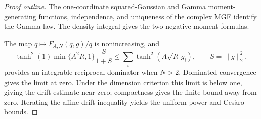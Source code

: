 \begin{proof}[Proof outline]
  \leanok
  The one-coordinate squared-Gaussian and Gamma moment-generating functions,
  independence, and uniqueness of the complex MGF identify the Gamma law. The
  density integral gives the two negative-moment formulas.

  The map $q\mapsto F_{A,N}(q,g)/q$ is nonincreasing, and
  \[
    \tanh^2(1)\min\{A^2R,1\}\frac{S}{1+S}
      \leq \sum_i\tanh^2(A\sqrt R\,g_i),
    \qquad S=\|g\|_2^2,
  \]
  provides an integrable reciprocal dominator when $N>2$. Dominated
  convergence gives the limit at zero. Under the dimension criterion this
  limit is below one, giving the drift estimate near zero; compactness gives
  the finite bound away from zero. Iterating the affine drift inequality
  yields the uniform power and Cesàro bounds.
\end{proof}

